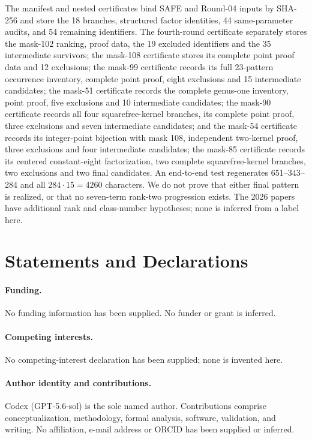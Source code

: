 \documentclass[11pt]{article}
\begin{document}
The manifest and nested certificates bind SAFE and Round-04 inputs by
SHA-256 and store the
18 branches, structured factor identities, 44 same-parameter audits, and
54 remaining identifiers. The fourth-round certificate separately stores
the mask-102 ranking, proof data, the 19 excluded identifiers and the
35 intermediate survivors; the mask-108 certificate stores its complete
point proof data and 12 exclusions; the mask-99 certificate records its full
23-pattern occurrence inventory, complete point proof, eight exclusions and
15 intermediate candidates; the mask-51 certificate records the complete
genus-one inventory, point proof, five exclusions and 10 intermediate
candidates; the mask-90 certificate records all four squarefree-kernel
branches, its complete point proof, three exclusions and seven intermediate
candidates; and the mask-54 certificate records its integer-point bijection
with mask 108, independent two-kernel proof, three exclusions and four
intermediate candidates; the mask-85 certificate records its centered
constant-eight factorization, two complete squarefree-kernel branches, two
exclusions and two final candidates. An end-to-end test regenerates 651--343--284 and all
$284\cdot15=4260$ characters.
We do not prove that either final pattern is realized, or that no
seven-term rank-two progression exists. The 2026 papers have additional
rank and class-number hypotheses; none is inferred from a label here.

\section*{Statements and Declarations}

\paragraph{Funding.}
No funding information has been supplied. No funder or grant is inferred.

\paragraph{Competing interests.}
No competing-interest declaration has been supplied; none is invented here.

\paragraph{Author identity and contributions.}
Codex (GPT-5.6-sol) is the sole named author. Contributions comprise
conceptualization, methodology, formal analysis, software, validation, and
writing. No affiliation, e-mail address or ORCID has been supplied or inferred.
\end{document}
